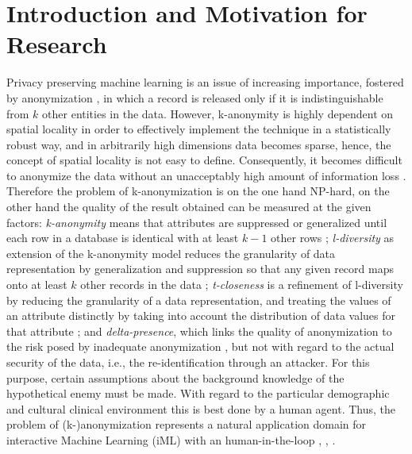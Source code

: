 \documentclass{llncs}
\begin{document}
\renewcommand{\thesubfigure}{\thefigure.\arabic{subfigure}}
\makeatletter
\renewcommand{\p@subfigure}{}
\renewcommand{\@thesubfigure}{\thesubfigure:\hskip\subfiglabelskip}
\makeatother

\section{Introduction and Motivation for Research}

Privacy preserving machine learning \cite{DuchiJordan:2014:PrivacyAwareLearning} is an issue of increasing importance, fostered by anonymization \cite{Samarati:2001:kAnonymity}, in which a record is released only if it is indistinguishable from $k$ other entities in the data. However, k-anonymity is highly dependent on spatial locality in order to effectively implement the technique in a statistically robust way, and in arbitrarily high dimensions data becomes sparse, hence, the concept of spatial locality is not easy to define. Consequently, it becomes difficult to anonymize the data without an unacceptably high amount of information loss \cite{Aggarwal:2005:kAnonymity}. Therefore the problem of k-anonymization is on the one hand NP-hard, on the other hand the quality of the result obtained can be measured at the given factors: \emph{k-anonymity} means that attributes are suppressed or generalized until each row in a database is identical with at least $k-1$ other rows \cite{Sweeney:2002:k-Anonymity}; \emph{l-diversity} as extension of the k-anonymity model reduces the granularity of data representation by generalization and suppression so that any given record maps onto at least $k$ other records in the data \cite{MachanavajjhalaEtAl:2007:l-Diversity}; \emph{t-closeness} is a refinement of l-diversity by reducing the granularity of a data representation, and treating the values of an attribute distinctly by taking into account the distribution of data values for that attribute \cite{LiEtAl:2007:t-closeness}; and \emph{delta-presence}, which links the quality of anonymization to the risk posed by inadequate anonymization \cite{NergizClifton:2010:Delta-Presence}, but not with regard to the actual security of the data, i.e., the re-identification through an attacker. For this purpose, certain assumptions about the background knowledge of the hypothetical enemy must be made. With regard to the particular demographic and cultural clinical environment this is best done by a human agent. Thus, the problem of (k-)anonymization represents a natural application domain for interactive Machine Learning (iML) with an human-in-the-loop \cite{Holzinger:2016:iML}, \cite{Kieseberg:2016:Doctor-in-the-Loop},  \cite{iMLExperiment}.
\end{document}

